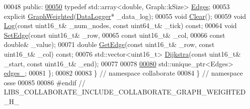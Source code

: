 \begin{DoxyCode}
00048  \textcolor{keyword}{public}:
\hyperlink{classosse_1_1collaborate_1_1_graph_weighted_aa604a648e701d85c8deb818f13b64097}{00050}   \textcolor{keyword}{typedef} std::array<double, Graph::kSize> \hyperlink{classosse_1_1collaborate_1_1_graph_weighted_aa604a648e701d85c8deb818f13b64097}{Edges};
00053   \textcolor{keyword}{explicit} \hyperlink{classosse_1_1collaborate_1_1_graph_weighted_a983e8d0efd6bba488b979b546cb078ff}{GraphWeighted}(\hyperlink{classosse_1_1collaborate_1_1_data_logger}{DataLogger}* \_data\_log);
00055   \textcolor{keywordtype}{void} \hyperlink{classosse_1_1collaborate_1_1_graph_weighted_a485197f02e24b37e2e2e47136548aa3d}{Clear}();
00059   \textcolor{keywordtype}{void} \hyperlink{classosse_1_1collaborate_1_1_graph_weighted_ab55668685b7bde8d3553cedeb95efab3}{Log}(\textcolor{keyword}{const} uint16\_t& \_num\_nodes, \textcolor{keyword}{const} uint64\_t& \_tick) \textcolor{keyword}{const};
00064   \textcolor{keywordtype}{void} \hyperlink{classosse_1_1collaborate_1_1_graph_weighted_a20ad6c253cec6b39d5d2cee4aa5ea073}{SetEdge}(\textcolor{keyword}{const} uint16\_t& \_row,
00065                \textcolor{keyword}{const} uint16\_t& \_col,
00066                \textcolor{keyword}{const} \textcolor{keywordtype}{double}& \_value);
00071   \textcolor{keywordtype}{double} \hyperlink{classosse_1_1collaborate_1_1_graph_weighted_a10d1d7bb90d63fa8461e044ca5b2bd20}{GetEdge}(\textcolor{keyword}{const} uint16\_t& \_row, \textcolor{keyword}{const} uint16\_t& \_col) \textcolor{keyword}{const};
00076   std::vector<uint16\_t> \hyperlink{classosse_1_1collaborate_1_1_graph_weighted_a657a68399222496d6664418061fe2108}{Dijkstra}(\textcolor{keyword}{const} uint16\_t& \_start, \textcolor{keyword}{const} uint16\_t& \_end);
00077 
00078 
\hyperlink{classosse_1_1collaborate_1_1_graph_weighted_a60944e002d7910e9de5d2bba3ea87e74}{00080}   std::unique\_ptr<Edges> \hyperlink{classosse_1_1collaborate_1_1_graph_weighted_a60944e002d7910e9de5d2bba3ea87e74}{edges\_};
00081 \};
00082 
00083 \}  \textcolor{comment}{// namespace collaborate}
00084 \}  \textcolor{comment}{// namespace osse}
00085 
00086 \textcolor{preprocessor}{#endif  // LIBS\_COLLABORATE\_INCLUDE\_COLLABORATE\_GRAPH\_WEIGHTED\_H\_}
\end{DoxyCode}
